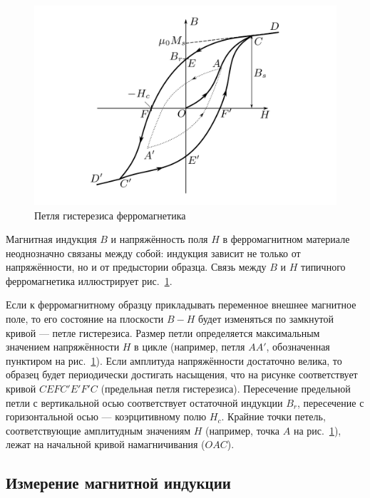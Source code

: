 \documentclass[a4paper, 12pt]{article}
\begin{document}
\begin{figure}[H]
\begin{center}
    \includegraphics[scale=2]{1.png}
\end{center}
\caption{Петля гистерезиса ферромагнетика}
\label{fig:petlya}
\end{figure}

Магнитная индукция $ B $ и напряжённость поля $ H $ в ферромагнитном материале неоднозначно связаны между собой: индукция зависит
не только от напряжённости, но и от предыстории образца. Связь между $ B $ и $ H $ типичного ферромагнетика иллюстрирует рис.~\ref{fig:petlya}.

Если к ферромагнитному образцу прикладывать переменное внешнее
магнитное поле, то его состояние на плоскости $ B-H $ будет изменяться
по замкнутой кривой — петле гистерезиса. Размер петли определяется
максимальным значением напряжённости $ H $ в цикле (например, петля $ AA' $,
обозначенная пунктиром на рис.~\ref{fig:petlya}). Если амплитуда напряжённости достаточно велика, то образец будет периодически достигать насыщения,
что на рисунке соответствует кривой $ CEFC'E'F'C $ (предельная петля
гистерезиса). Пересечение предельной петли с вертикальной осью соответствует остаточной индукции $B_r$, пересечение с горизонтальной осью
— коэрцитивному полю $H_c$. Крайние точки петель, соответствующие амплитудным значениям $ H $ (например, точка $ A $ на рис.~\ref{fig:petlya}), лежат на начальной кривой намагничивания ($ OAC $).

\subsection{Измерение магнитной индукции}
\end{document}
